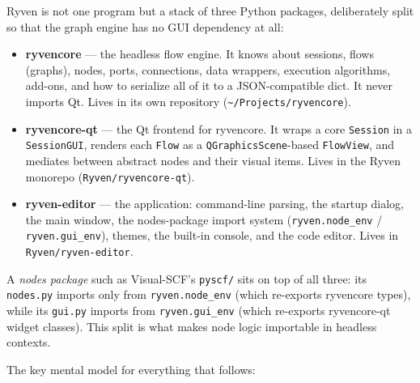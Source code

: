 \documentclass[10pt,a4paper]{article}
\newcommand{\code}[1]{\texttt{\small #1}}
\begin{document}
Ryven is not one program but a stack of three Python packages, deliberately split so that
the graph engine has no GUI dependency at all:

\begin{itemize}
\item \textbf{ryvencore} --- the headless flow engine. It knows about sessions, flows
      (graphs), nodes, ports, connections, data wrappers, execution algorithms, add-ons,
      and how to serialize all of it to a JSON-compatible dict. It never imports Qt.
      Lives in its own repository (\code{\textasciitilde/Projects/ryvencore}).
\item \textbf{ryvencore-qt} --- the Qt frontend for ryvencore. It wraps a core
      \code{Session} in a \code{SessionGUI}, renders each \code{Flow} as a
      \code{QGraphicsScene}-based \code{FlowView}, and mediates between abstract nodes
      and their visual items. Lives in the Ryven monorepo
      (\code{Ryven/ryvencore-qt}).
\item \textbf{ryven-editor} --- the application: command-line parsing, the startup
      dialog, the main window, the nodes-package import system
      (\code{ryven.node\_env} / \code{ryven.gui\_env}), themes, the built-in console,
      and the code editor. Lives in \code{Ryven/ryven-editor}.
\end{itemize}

A \emph{nodes package} such as Visual-SCF's \code{pyscf/} sits on top of all three: its
\code{nodes.py} imports only from \code{ryven.node\_env} (which re-exports ryvencore
types), while its \code{gui.py} imports from \code{ryven.gui\_env} (which re-exports
ryvencore-qt widget classes). This split is what makes node logic importable in headless
contexts.

The key mental model for everything that follows:
\end{document}
